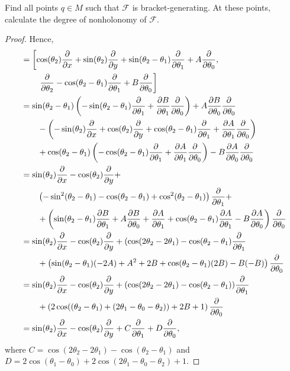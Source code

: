 \documentclass{article}
\begin{document}
 Find all points $q \in M$ such that $\mathcal F$ is bracket-generating. At these points, calculate the degree of nonholonomy of $\mathcal F$.
\begin{proof}
Hence,
\begin{align*}
[X_1, X_2] & = \left[ \cos(\theta_2) \pder x  + \sin(\theta_2) \pder y  + \sin(\theta_2 - \theta_1)  \pder {\theta_1} + A \pder {\theta_0}, \right.
\\ & \quad \quad \left. \pder {\theta_2} - \cos(\theta_2 - \theta_1) \pder {\theta_1} + B \pder {\theta_0} \right]
\\ & =  \sin(\theta_2 - \theta_1) \left( -\sin(\theta_2 - \theta_1) \pder {\theta_1} + \pder[B] {\theta_1} \pder {\theta_0} \right) + A \pder[B] {\theta_0} \pder {\theta_0}
\\ & \quad \quad - \left( -\sin(\theta_2) \pder x + \cos(\theta_2) \pder y + \cos (\theta_2 - \theta_1) \pder {\theta_1} + \pder[A] {\theta_1} \pder {\theta_0} \right) 
\\ & \quad \quad + \cos(\theta_2 - \theta_1) \left( -\cos(\theta_2 - \theta_1) \pder {\theta_1} + \pder[A] {\theta_1} \pder {\theta_0} \right) - B \pder[A] {\theta_0} \pder {\theta_0}
\\ & = \sin(\theta_2) \pder x  - \cos(\theta_2) \pder y + 
\\ & \quad \quad \left(- \sin^2(\theta_2 - \theta_1) - \cos (\theta_2 - \theta_1) + \cos^2(\theta_2 - \theta_1) \right) \pder {\theta_1} + 
\\ & \quad \quad + \left(  \sin (\theta_2 - \theta_1) \pder[B] {\theta_1}  + A \pder[B] {\theta_0} +  \pder[A]{\theta_1} + \cos(\theta_2 - \theta_1) \pder[A] {\theta_1} - B \pder[A]{\theta_0} \right) \pder {\theta_0}
\\ & = \sin(\theta_2) \pder x  - \cos(\theta_2) \pder y + (\cos(2 \theta_2 - 2 \theta_1) - \cos(\theta_2 - \theta_1) \pder {\theta_1}
\\ & \quad \quad + \left(  \sin (\theta_2 - \theta_1) (-2A)  + A^2 +  2B + \cos(\theta_2 - \theta_1) (2B) - B(-B) \right) \pder {\theta_0}
\\ & = \sin(\theta_2) \pder x  - \cos(\theta_2) \pder y + (\cos(2 \theta_2 - 2 \theta_1) - \cos(\theta_2 - \theta_1)) \pder {\theta_1}
\\ & \quad \quad  + \left( 2 \cos((\theta_2 - \theta_1) + (2\theta_1 - \theta_0 - \theta_2)) +  2B + 1  \right) \pder {\theta_0}
\\ & = \sin(\theta_2) \pder x  - \cos(\theta_2) \pder y + C \pder {\theta_1} + D \pder {\theta_0},
\end{align*}
where $C = \cos(2 \theta_2 - 2 \theta_1) - \cos(\theta_2 - \theta_1) $
 and $D = 2 \cos(\theta_1 - \theta_0) +  2 \cos(2 \theta_1 - \theta_0 - \theta_2) + 1$.


\end{proof}
\end{document}
